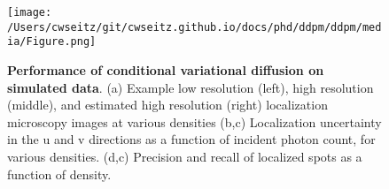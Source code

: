 

\begin{figure}[t]
\centering
\texttt{[image: /Users/cwseitz/git/cwseitz.github.io/docs/phd/ddpm/ddpm/media/Figure.png]}
\caption{\textbf{Performance of conditional variational diffusion on simulated data}. (a) Example low resolution (left), high resolution (middle), and estimated high resolution (right) localization microscopy images at various densities (b,c) Localization uncertainty in the u and v directions as a function of incident photon count, for various densities. (d,c) Precision and recall of localized spots as a function of density.}
\label{fig:cvdmsim}
\end{figure}




